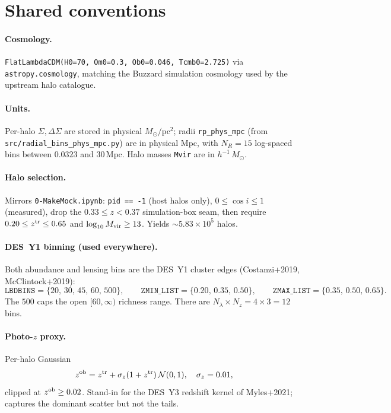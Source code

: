 \documentclass[a4paper, 11pt]{article}
\newcommand{\zob}{z^{\rm ob}}
\newcommand{\ztr}{z^{\rm tr}}
\newcommand{\hMsun}{h^{-1}\,M_{\odot}}
\newcommand{\blk}[1]{\textcolor{datablockcol}{\texttt{#1}}}
\newcommand{\pyfile}[1]{{\small\texttt{#1}}}
\begin{document}
\section{Shared conventions}
\label{sec:conventions}

\paragraph{Cosmology.} \texttt{FlatLambdaCDM(H0=70, Om0=0.3, Ob0=0.046,
Tcmb0=2.725)} via \texttt{astropy.cosmology}, matching the Buzzard
simulation cosmology used by the upstream halo catalogue.

\paragraph{Units.} Per-halo $\Sigma, \Delta\Sigma$ are stored in physical
$M_\odot/\mathrm{pc}^2$; radii \blk{rp\_phys\_mpc} (from
\pyfile{src/radial\_bins\_phys\_mpc.py}) are in physical Mpc, with $N_R = 15$
log-spaced bins between $0.0323$ and $30\,\mathrm{Mpc}$. Halo masses
\blk{Mvir} are in $\hMsun$.

\paragraph{Halo selection.} Mirrors \pyfile{0-MakeMock.ipynb}:
\texttt{pid == -1} (host halos only), $0 \le \cos i \le 1$ (measured), drop
the $0.33 \le z < 0.37$ simulation-box seam, then require $0.20 \le \ztr
\le 0.65$ and $\log_{10} M_{\rm vir} \ge 13$. Yields $\sim 5.83 \times
10^5$ halos.

\paragraph{DES~Y1 binning (used everywhere).} Both abundance and lensing
bins are the DES~Y1 cluster edges (Costanzi+2019, McClintock+2019):
\begin{equation*}
  \texttt{LBDBINS}    = \{20,\, 30,\, 45,\, 60,\, 500\},\qquad
  \texttt{ZMIN\_LIST} = \{0.20,\, 0.35,\, 0.50\},\qquad
  \texttt{ZMAX\_LIST} = \{0.35,\, 0.50,\, 0.65\}.
\end{equation*}
The $500$ caps the open $[60, \infty)$ richness range. There are
$N_\lambda \times N_z = 4 \times 3 = 12$ bins.

\paragraph{Photo-$z$ proxy.} Per-halo Gaussian
\begin{equation*}
  \zob = \ztr + \sigma_z(1 + \ztr)\,\mathcal N(0, 1),\quad \sigma_z = 0.01,
\end{equation*}
clipped at $\zob \ge 0.02$. Stand-in for the DES~Y3 redshift kernel of
Myles+2021; captures the dominant scatter but not the tails.
\end{document}

